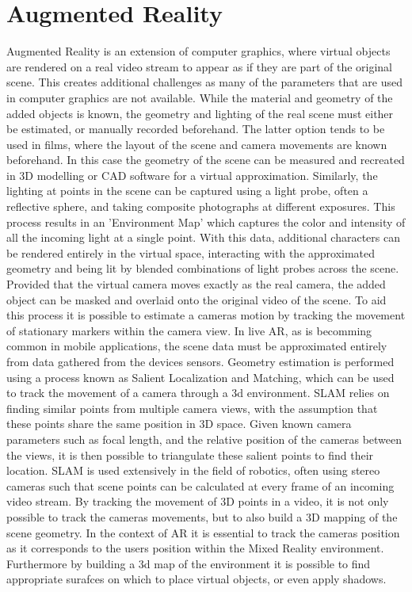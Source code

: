 \documentclass[ %
                    author={Gavin Parker},
                supervisor={Dr. Neill Campbell},
                    degree={MEng},
                     title={Deep Siamese Networks for Illumination Estimation from Stereo Images},
                  subtitle={},
                      type={research},
                      year={2018} ]{dissertation}
\begin{document}
\section{Augmented Reality}
Augmented Reality is an extension of computer graphics, where virtual objects are rendered on a real video stream to appear as if they are part of the original scene. This creates additional challenges as many of the parameters that are used in computer graphics are not available. While the material and geometry of the added objects is known, the geometry and lighting of the real scene must either be estimated, or manually recorded beforehand. The latter option tends to be used in films, where the layout of the scene and camera movements are known beforehand. In this case the geometry of the scene can be measured and recreated in 3D modelling or CAD software for a virtual approximation. Similarly, the lighting at points in the scene can be captured using a light probe, often a reflective sphere, and taking composite photographs at different exposures. This process results in an 'Environment Map' which captures the color and intensity of all the incoming light at a single point. With this data, additional characters can be rendered entirely in the virtual space, interacting with the approximated geometry and being lit by blended combinations of light probes across the scene. Provided that the virtual camera moves exactly as the real camera, the added object can be masked and overlaid onto the original video of the scene. To aid this process it is possible to estimate a cameras motion by tracking the movement of stationary markers within the camera view.
\newline
In live AR, as is becomming common in mobile applications, the scene data must be approximated entirely from data gathered from the devices sensors. Geometry estimation is performed using a process known as Salient Localization and Matching, which can be used to track the movement of a camera through a 3d environment. SLAM relies on finding similar points from multiple camera views, with the assumption that these points share the same position in 3D space. Given known camera parameters such as focal length, and the relative position of the cameras between the views, it is then possible to triangulate these salient points to find their location. SLAM is used extensively in the field of robotics, often using stereo cameras such that scene points can be calculated at every frame of an incoming video stream. By tracking the movement of 3D points in a video, it is not only possible to track the cameras movements, but to also build a 3D mapping of the scene geometry. In the context of AR it is essential to track the cameras position as it corresponds to the users position within the Mixed Reality environment. Furthermore by building a 3d map of the environment it is possible to find appropriate surafces on which to place virtual objects, or even apply shadows.
\end{document}
